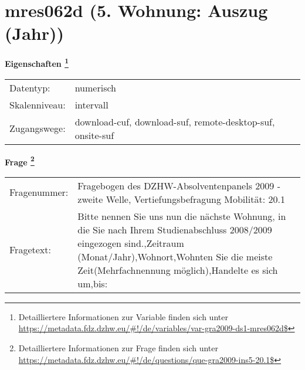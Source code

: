 
    \setcounter{footnote}{0}

    \vspace*{-1.8cm}
	\section{mres062d (5. Wohnung: Auszug (Jahr))}
	\label{section:mres062d}



    \vspace*{0.5cm}
    \noindent\textbf{Eigenschaften
	\footnote{Detailliertere Informationen zur Variable finden sich unter
		\url{https://metadata.fdz.dzhw.eu/\#!/de/variables/var-gra2009-ds1-mres062d$}}}\\
	\begin{tabularx}{\hsize}{@{}lX}
	Datentyp: & numerisch \\
	Skalenniveau: & intervall \\
	Zugangswege: &
	  download-cuf, 
	  download-suf, 
	  remote-desktop-suf, 
	  onsite-suf
 \\
    \end{tabularx}



				\vspace*{0.5cm}
                \noindent\textbf{Frage
	                \footnote{Detailliertere Informationen zur Frage finden sich unter
		              \url{https://metadata.fdz.dzhw.eu/\#!/de/questions/que-gra2009-ins5-20.1$}}}\\
				\begin{tabularx}{\hsize}{@{}lX}
					Fragenummer: &
					  Fragebogen des DZHW-Absolventenpanels 2009 - zweite Welle, Vertiefungsbefragung Mobilität:
					  20.1
 \\
					Fragetext: & Bitte nennen Sie uns nun die nächste Wohnung, in die Sie nach Ihrem Studienabschluss 2008/2009 eingezogen sind.,Zeitraum (Monat/Jahr),Wohnort,Wohnten Sie die meiste Zeit(Mehrfachnennung möglich),Handelte es sich um,bis: \\
				\end{tabularx}





